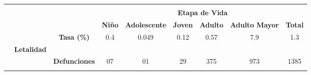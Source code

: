 	\begin{tabular}{ccc|cccccc|}
		\cline{4-9}
		\multicolumn{1}{l}{} 
		&
		&
		&\multicolumn{6}{c|}{\cellcolor[HTML]{F2F2F2}} \\ 
		\multicolumn{1}{l}{} 
		&\multicolumn{1}{l}{} 
		&\multicolumn{1}{l|}{} 
		&\multicolumn{6}{c|}{\multirow{-2}{*}{\cellcolor[HTML]{F2F2F2}\textbf{Etapa de Vida}}} \\ \cline{4-9} 
		\multicolumn{1}{l}{} 
		&\multicolumn{1}{l}{} 
		&\multicolumn{1}{l|}{} 
		&\multicolumn{1}{c|}{\cellcolor[HTML]{F2F2F2}\textbf{Niño}} 
		&\multicolumn{1}{l|}{\cellcolor[HTML]{F2F2F2}\textbf{Adolescente}} 
		&\multicolumn{1}{l|}{\cellcolor[HTML]{F2F2F2}\textbf{Joven}} 
		&\multicolumn{1}{l|}{\cellcolor[HTML]{F2F2F2}\textbf{Adulto}} 
		&\multicolumn{1}{l|}{\cellcolor[HTML]{F2F2F2}\textbf{Adulto Mayor}} 
		&\cellcolor[HTML]{F2F2F2}\textbf{Total} \\ \hline
		\rowcolor[HTML]{ECF4FF} 
		\multicolumn{1}{|c|}{\cellcolor[HTML]{ECF4FF}} 
		&\multicolumn{1}{c|}{\cellcolor[HTML]{ECF4FF}} 
		&\textbf{Tasa (\%)} 
		&\multicolumn{1}{c|}{\cellcolor[HTML]{ECF4FF}0.4} 
		&\multicolumn{1}{c|}{\cellcolor[HTML]{ECF4FF}0.049} 
		&\multicolumn{1}{c|}{\cellcolor[HTML]{ECF4FF}0.12} 
		&\multicolumn{1}{c|}{\cellcolor[HTML]{ECF4FF}0.57} 
		&\multicolumn{1}{c|}{\cellcolor[HTML]{ECF4FF}7.9} 
		&1.3 \\ \cline{3-9} 
		\rowcolor[HTML]{ECF4FF} 
		\multicolumn{1}{|c|}{\cellcolor[HTML]{ECF4FF}} 
		&\multicolumn{1}{c|}{\multirow{-2}{*}{\cellcolor[HTML]{ECF4FF}\textbf{Letalidad}}}&\cellcolor[HTML]{ECF4FF} 
		&\multicolumn{1}{c|}{\cellcolor[HTML]{ECF4FF}} 
		&\multicolumn{1}{c|}{\cellcolor[HTML]{ECF4FF}} 
		&\multicolumn{1}{c|}{\cellcolor[HTML]{ECF4FF}} 
		&\multicolumn{1}{c|}{\cellcolor[HTML]{ECF4FF}} 
		&\multicolumn{1}{c|}{\cellcolor[HTML]{ECF4FF}} 
		&\cellcolor[HTML]{ECF4FF} \\ \cline{2-2}
		\rowcolor[HTML]{ECF4FF} 
		\multicolumn{1}{|c|}{\cellcolor[HTML]{ECF4FF}} &
		\multicolumn{1}{c|}{\cellcolor[HTML]{ECF4FF}} &
		\multirow{-2}{*}{\cellcolor[HTML]{ECF4FF}\textbf{Defunciones}} &
		\multicolumn{1}{c|}{\multirow{-2}{*}{\cellcolor[HTML]{ECF4FF}07}} &
		\multicolumn{1}{c|}{\multirow{-2}{*}{\cellcolor[HTML]{ECF4FF}01}} &
		\multicolumn{1}{c|}{\multirow{-2}{*}{\cellcolor[HTML]{ECF4FF}29}} &
		\multicolumn{1}{c|}{\multirow{-2}{*}{\cellcolor[HTML]{ECF4FF}375}} &
		\multicolumn{1}{c|}{\multirow{-2}{*}{\cellcolor[HTML]{ECF4FF}973}} &
		\multirow{-2}{*}{\cellcolor[HTML]{ECF4FF}1385} \\ \cline{3-9} 
		\rowcolor[HTML]{ECF4FF} 

\end{tabular}
